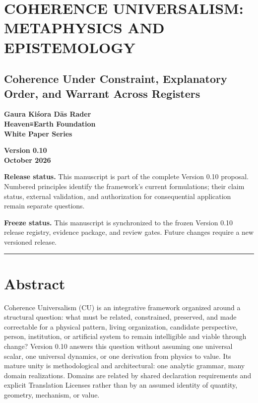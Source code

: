 \documentclass[
  11pt,
]{article}
\author{}
\date{}
\begin{document}
\section{COHERENCE UNIVERSALISM: METAPHYSICS AND
EPISTEMOLOGY}\label{coherence-universalism-metaphysics-and-epistemology}

\subsection{Coherence Under Constraint, Explanatory Order, and Warrant
Across
Registers}\label{coherence-under-constraint-explanatory-order-and-warrant-across-registers}

\textbf{Gaura Kiśora Dās Rader}\\
\textbf{Heaven≡Earth Foundation}\\
\textbf{White Paper Series}

\textbf{Version 0.10}\\
\textbf{October 2026}

\textbf{Release status.} This manuscript is part of the complete Version
0.10 proposal. Numbered principles identify the framework's current
formulations; their claim status, external validation, and authorization
for consequential application remain separate questions.

\textbf{Freeze status.} This manuscript is synchronized to the frozen
Version 0.10 release registry, evidence package, and review gates.
Future changes require a new versioned release.

\begin{center}\rule{0.5\linewidth}{0.5pt}\end{center}

\section{Abstract}\label{abstract}

Coherence Universalism (CU) is an integrative framework organized around
a structural question: what must be related, constrained, preserved, and
made correctable for a physical pattern, living organization, candidate
perspective, person, institution, or artificial system to remain
intelligible and viable through change? Version 0.10 answers this
question without assuming one universal scalar, one universal dynamics,
or one derivation from physics to value. Its mature unity is
methodological and architectural: one analytic grammar, many domain
realizations. Domains are related by shared declaration requirements and
explicit Translation Licenses rather than by an assumed identity of
quantity, geometry, mechanism, or value.
\end{document}
